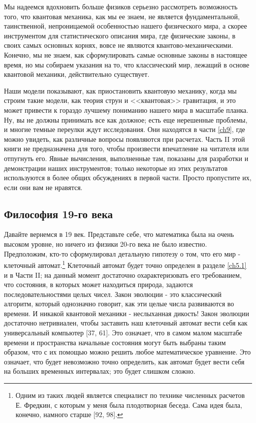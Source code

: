 \documentclass[main.tex]{subfiles}
\begin{document}
Мы надеемся вдохновить больше физиков серьезно рассмотреть возможность того, что квантовая механика, как мы ее знаем, не является фундаментальной, таинственной, непроницаемой особенностью нашего физического мира, а скорее инструментом для статистического описания мира, где физические законы, в своих самых основных корнях, вовсе не являются квантово-механическими. Конечно, мы не знаем, как сформулировать самые основные законы в настоящее время, но мы собираем указания на то, что классический мир, лежащий в основе квантовой механики, действительно существует. 

Наши модели показывают, как приостановить квантовую механику, когда мы строим такие модели, как теория струн и <<квантовая>> гравитация, и это может привести к гораздо лучшему пониманию нашего мира в масштабе планка. Ну, вы не должны принимать все как должное; есть еще нерешенные проблемы, и многие темные переулки ждут исследования. Они находятся в части \ref{ch9}, где можно увидеть, как различные вопросы появляются при расчетах. Часть II этой книги не предназначена для того, чтобы произвести впечатление на читателя или отпугнуть его. Явные вычисления, выполненные там, показаны для разработки и демонстрации наших инструментов; только некоторые из этих результатов используются в более общих обсуждениях в первой части. Просто пропустите их, если они вам не нравятся.  

\subsection{Философия 19-го века}\label{ch1.3}

Давайте вернемся в 19 век. Представьте себе, что математика была на очень высоком уровне, но ничего из физики 20-го века не было известно. Предположим, кто-то сформулировал детальную гипотезу о том, что его мир - клеточный автомат.\footnote{Одним из таких людей является специалист по технике численных расчетов Е. Фредкин, с которым у меня была плодотворная беседа. Сама идея была, конечно, намного старше [92, 98].} Клеточный автомат будет точно определен в разделе \ref{ch5.1} и в Части II; на данный момент достаточно охарактеризовать его требованием, что состояния, в которых может находиться природа, задаются последовательностями целых чисел. Закон эволюции - это классический алгоритм, который однозначно говорит, как эти целые числа развиваются во времени. И никакой квантовой механики - неслыханная дикость! Закон эволюции достаточно нетривиален, чтобы заставить наш клеточный автомат вести себя как универсальный компьютер [37, 61]. Это означает, что в самом малом масштабе времени и пространства начальные состояния могут быть выбраны таким образом, что с их помощью можно решить любое математическое уравнение. Это означает, что будет невозможно точно определить, как автомат будет вести себя на больших временных интервалах; это будет слишком сложно. 
\end{document}
